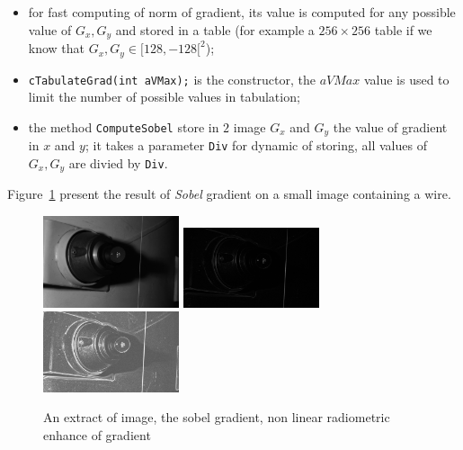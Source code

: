 \begin{itemize}
    \item  for fast computing of norm of gradient, its value is computed
           for any possible value of $G_x,G_y$ and stored in a table
           (for example a $256 \times 256$ table if we know that $G_x, G_y \in [128,-128[^2 $);

    \item  {\tt cTabulateGrad(int aVMax);} is the constructor, the $aVMax$ value
          is used to limit the number of possible values in tabulation;

    \item  the method {\tt ComputeSobel} store in $2$ image $G_x$ and $G_y$ the value
           of gradient in $x$ and $y$;  it takes a parameter {\tt Div} for dynamic of
           storing, all values of $G_x,G_y$ are divied by {\tt Div}.

\end{itemize}

Figure~\ref{Fig:Line:Grad} present the result of \emph{Sobel} gradient on a small image
containing a wire.


\begin{figure}
\centering
        \includegraphics[width=4cm]{Methods/ImagesFils/ImagOri.jpg }
        \includegraphics[width=4cm]{Methods/ImagesFils/GradInit.jpg }
        \includegraphics[width=4cm]{Methods/ImagesFils/GradNonLinear.jpg }
        \caption{An extract of image, the sobel gradient, non linear radiometric enhance of gradient}
\label{Fig:Line:Grad}
\end{figure}


